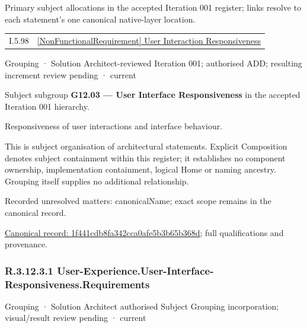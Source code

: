 Primary subject allocations in the accepted Iteration 001 register; links resolve to each statement’s one canonical native-layer location.\par
\begin{longtable}{p{.22\linewidth}p{.73\linewidth}}
I.5.98 & \hyperref[element:0f07f89a3a854bfdac4d4fc423feefca]{[NonFunctionalRequirement] User Interaction Responsiveness} \\
\end{longtable}
\label{element:1f441cdb8fa342cca0afe5b3b65b368d}
{\small Grouping · Solution Architect-reviewed Iteration 001; authorised ADD; resulting increment review pending · current}\par

Subject subgroup \textbf{G12.03 — User Interface Responsiveness} in the accepted Iteration 001 hierarchy.



Responsiveness of user interactions and interface behaviour.



This is subject organisation of architectural statements. Explicit Composition denotes subject containment within this register; it establishes no component ownership, implementation containment, logical Home or naming ancestry. Grouping itself supplies no additional relationship.


{\small Recorded unresolved matters: canonicalName; exact scope remains in the canonical record.}\par
{\footnotesize \href{../../../../continuum/grouping/1f441cdb8fa342cca0afe5b3b65b368d.md}{Canonical record: 1f441cdb8fa342cca0afe5b3b65b368d}; full qualifications and provenance.}\par
\subsubsection*{R.3.12.3.1 User-Experience.User-Interface-Responsiveness.Requirements}
\label{navigation:R.3.12.3.1}

\label{element:4643d0b24fe7420b8e3fd0f4a2f4b1de}
{\small Grouping · Solution Architect authorised Subject Grouping incorporation; visual/result review pending · current}\par

